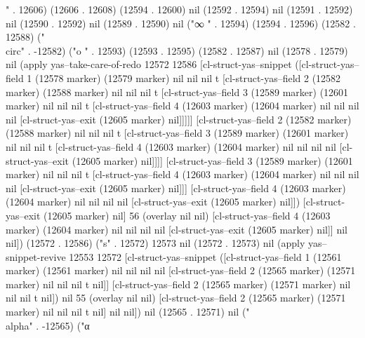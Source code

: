 " . 12606) (12606 . 12608) (12594 . 12600) nil (12592 . 12594) nil (12591 . 12592) nil (12590 . 12592) nil (12589 . 12590) nil ("∞
" . 12594) (12594 . 12596) (12582 . 12588) ("\\circ" . -12582) ("o
" . 12593) (12593 . 12595) (12582 . 12587) nil (12578 . 12579) nil (apply yas--take-care-of-redo 12572 12586 [cl-struct-yas--snippet ([cl-struct-yas--field 1 (12578 marker) (12579 marker) nil nil nil t [cl-struct-yas--field 2 (12582 marker) (12588 marker) nil nil nil t [cl-struct-yas--field 3 (12589 marker) (12601 marker) nil nil nil t [cl-struct-yas--field 4 (12603 marker) (12604 marker) nil nil nil nil [cl-struct-yas--exit (12605 marker) nil]]]]] [cl-struct-yas--field 2 (12582 marker) (12588 marker) nil nil nil t [cl-struct-yas--field 3 (12589 marker) (12601 marker) nil nil nil t [cl-struct-yas--field 4 (12603 marker) (12604 marker) nil nil nil nil [cl-struct-yas--exit (12605 marker) nil]]]] [cl-struct-yas--field 3 (12589 marker) (12601 marker) nil nil nil t [cl-struct-yas--field 4 (12603 marker) (12604 marker) nil nil nil nil [cl-struct-yas--exit (12605 marker) nil]]] [cl-struct-yas--field 4 (12603 marker) (12604 marker) nil nil nil nil [cl-struct-yas--exit (12605 marker) nil]]) [cl-struct-yas--exit (12605 marker) nil] 56 (overlay nil nil) [cl-struct-yas--field 4 (12603 marker) (12604 marker) nil nil nil nil [cl-struct-yas--exit (12605 marker) nil]] nil nil]) (12572 . 12586) ("s" . 12572) 12573 nil (12572 . 12573) nil (apply yas--snippet-revive 12553 12572 [cl-struct-yas--snippet ([cl-struct-yas--field 1 (12561 marker) (12561 marker) nil nil nil nil [cl-struct-yas--field 2 (12565 marker) (12571 marker) nil nil nil t nil]] [cl-struct-yas--field 2 (12565 marker) (12571 marker) nil nil nil t nil]) nil 55 (overlay nil nil) [cl-struct-yas--field 2 (12565 marker) (12571 marker) nil nil nil t nil] nil nil]) nil (12565 . 12571) nil ("\\alpha" . -12565) ("α
